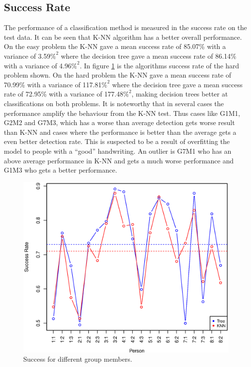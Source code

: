 \subsection{Success Rate}
The performance of a classification method is measured in the success rate on the test data.
It can be seen that K-NN algorithm has a better overall performance.
On the easy problem the K-NN gave a mean success rate of 
85.07\% with a variance of 3.59\(\%^2\)
where the decision tree gave a mean success rate of
86.14\% with a variance of 4.96\(\%^2\). 
In figure \ref{fig:success_comparison_hard} is the algorithms success rate of the hard problem shown.
On the hard problem the K-NN gave a mean success rate of 
70.99\% with a variance of 117.81\(\%^2\)
where the decision tree gave a mean success rate of
72.95\% with a variance of 177.48\(\%^2\), 
making decision trees better at classifications on both problems.
It is noteworthy that in several cases the performance amplify the behaviour from the K-NN test.
Thus cases like G1M1, G2M2 and G7M3, which has a worse than average detection gets worse result than K-NN 
and cases where the performance is better than the average gets a even better detection rate.
This is suspected to be a result of overfitting the model to people with a ``good'' handwriting.
An outlier is G7M1 who has an above average performance in K-NN and gets a much worse performance and G1M3 who gets a better performance.

\begin{figure}[H]
\centering
\includegraphics[width=\textwidth]{graphics/success_comp_hard}
\caption{Success for different group members.}
\label{fig:success_comparison_hard}
\end{figure}

